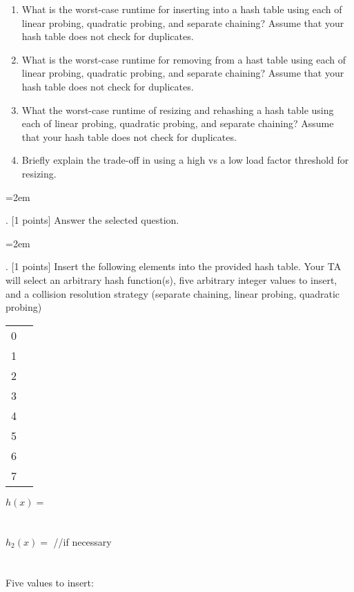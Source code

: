 \documentclass[10pt]{article}
\newcounter{quesnum}
\newcommand{\question}[2][??]{
\begin{list}{\labelitemi}{\leftmargin=2em}
\item [\arabic{quesnum}.] {[}{#1} points{]} {#2}
\end{list}
\addtocounter{quesnum}{1}
}
\newcommand{\answer}[2][??]{

\ifthenelse{\boolean{solution}}{
\color{red} #2 \color{black}}
{\vspace*{#1} }
}
\begin{document}
\begin{enumerate}[label=(\alph*)]
	\setlength\itemsep{0.25em}
	\item What is the worst-case runtime for inserting into a hash table using each of linear probing, quadratic probing, and separate chaining? Assume that your hash table does not check for duplicates.
	\item What is the worst-case runtime for removing from a hast table using each of linear probing, quadratic probing, and separate chaining? Assume that your hash table does not check for duplicates.
	\item What the worst-case runtime of resizing and rehashing a hash table using each of linear probing, quadratic probing, and separate chaining? Assume that your hash table does not check for duplicates.
	\item Briefly explain the trade-off in using a high vs a low load factor threshold for resizing.
\end{enumerate}

\question[1]{Answer the selected question.}

\answer[2in]{...}

\question[1]{Insert the following elements into the provided hash table. Your TA will select an arbitrary hash function(s), five arbitrary integer values to insert, and a collision resolution strategy (separate chaining, linear probing, quadratic probing)}

\begin{minipage}{0.5\textwidth}
\quad \quad \quad
\renewcommand{\arraystretch}{3}
\begin{tabular}{r|p{0.5in}|}
\cline{2-2}
0 &  \\ \cline{2-2} 
1 &  \\ \cline{2-2} 
2 &  \\ \cline{2-2} 
3 &  \\ \cline{2-2} 
4 &  \\ \cline{2-2} 
5 &  \\ \cline{2-2} 
6 &  \\ \cline{2-2} 
7 &  \\ \cline{2-2} 
\end{tabular}
\end{minipage}
\begin{minipage}{0.5\textwidth}
$h(x) =$
\\
\\
\\
$h_2(x) =$                       //if necessary
\\
\\
\\
Five values to insert:
\end{minipage}
\end{document}

